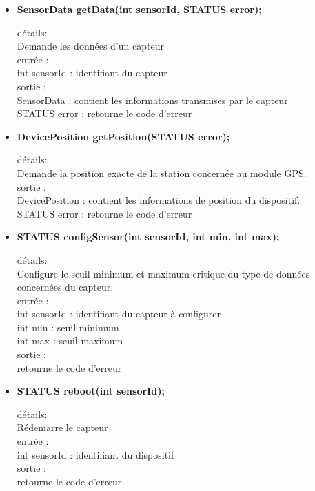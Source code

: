 \begin{itemize}

\item \textbf{SensorData getData(int sensorId, STATUS error);}
\begin{tabbing}
détails: \=\\
\>		Demande les données d'un capteur \\
entrée : \\ 
\>		int sensorId : identifiant du capteur \\
sortie : \\
\>		SensorData : contient les informations transmises par le capteur \\
\>		STATUS error : retourne le code d'erreur \\
\end{tabbing}

\item \textbf{DevicePosition getPosition(STATUS error);}
\begin{tabbing}
détails: \=\\
\>		Demande la position exacte de la station concernée au module GPS. \\
sortie : \\
\>		DevicePosition : contient les informations de position du dispositif. \\
\>		STATUS error : retourne le code d'erreur \\
\end{tabbing}


\item \textbf{STATUS configSensor(int sensorId, int min, int max);}
\begin{tabbing}
détails: \=\\
\>		Configure le seuil minimum et maximum critique du type de données concernées du capteur. \\
entrée : \\
\>		int sensorId : identifiant du capteur à configurer \\
\>		int min : seuil minimum \\
\>		int max : seuil maximum \\
sortie : \\
\>		retourne le code d'erreur \\
\end{tabbing}

\item \textbf{STATUS reboot(int sensorId);}
\begin{tabbing}
détails: \=\\
\>		Rédemarre le capteur \\
entrée : \\
\>		int sensorId : identifiant du dispositif \\
sortie : \\
\>		retourne le code d'erreur \\
\end{tabbing}


\end{itemize}
